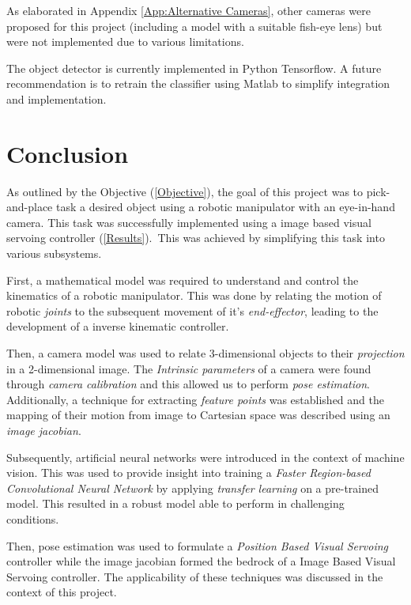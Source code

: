 \documentclass{UoNMCHA}
\numberwithin{equation}{section}
\begin{document}
As elaborated in Appendix \ref{App:Alternative Cameras}, other cameras were proposed for this project (including a model with a suitable fish-eye lens) but were not implemented due to various limitations.

The object detector is currently implemented in Python Tensorflow. A future recommendation is to retrain the classifier using Matlab to simplify integration and implementation.


\newpage
\section{Conclusion}\label{sec:Conclusion}

As outlined by the Objective (\ref{Objective}), the goal of this project was to pick-and-place task a desired object using a robotic manipulator with an eye-in-hand camera. This task was successfully implemented using a image based visual servoing controller (\ref{Results}).\
This was achieved by simplifying this task into various subsystems.\

First, a mathematical model was required to understand and control the kinematics of a robotic manipulator. This was done by relating the motion of robotic \textit{joints} to the subsequent movement of it's \textit{end-effector}, leading to the development of a inverse kinematic controller.\

Then, a camera model was used to relate 3-dimensional objects to their \textit{projection} in a 2-dimensional image. The \textit{Intrinsic parameters} of a camera were found through \textit{camera calibration} and this allowed us to perform \textit{pose estimation}. Additionally, a technique for extracting \textit{feature points} was established and the mapping of their motion from image to Cartesian space was described using an \textit{image jacobian}. \

Subsequently, artificial neural networks were introduced in the context of machine vision. This was used to provide insight into training a \textit{Faster Region-based Convolutional Neural Network} by applying \textit{transfer learning} on a pre-trained model. This resulted in a robust model able to perform in challenging conditions.\

Then, pose estimation was used to formulate a \textit{Position Based Visual Servoing} controller while the image jacobian formed the bedrock of a Image Based Visual Servoing controller. The applicability of these techniques was discussed in the context of this project. \
\end{document}
